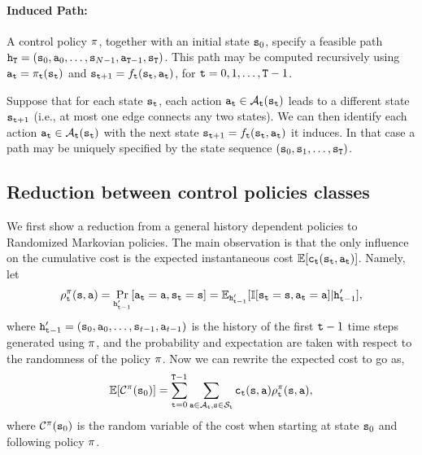 \paragraph{Induced Path:}
A control policy $\pi $, together with an initial state
${{\tt s}_0}$, specify a feasible path ${{\tt h}_{\tt T}} =
({{\tt s}_0},{{\tt a}_0}, \ldots ,{{\tt s}_{N -
1}},{{\tt a}_{{\tt T} - 1}},{{\tt s}_{\tt T}})$. This path may be
computed recursively using ${{\tt a}_{{\tt t}}} = {\pi
_{{\tt t}}}({{\tt s}_{{\tt t}}})$ and ${{\tt s}_{{\tt t} + 1}} =
{f_{{\tt t}}}({{\tt s}_{{\tt t}}},{{\tt a}_{{\tt t}}})$, for ${\tt t} =
0,1, \ldots ,{\tt T} - 1$.

\begin{remark}
Suppose that for each state ${{\tt s}_{{\tt t}}}$, each action
${{\tt a}_{{\tt t}}} \in {\mathcal{A}_{{\tt t}}}({{\tt s}_{{\tt t}}})$
leads to a different state ${{\tt s}_{{\tt t} + 1}}$ (i.e., at most
one edge connects any two states). We can then identify each action
${{\tt a}_{{\tt t}}} \in {\mathcal{A}_{{\tt t}}}({\tt s}_{{\tt t}})$ with
the next state ${{\tt s}_{{\tt t} + 1}} =
{f_{{\tt t}}}({\tt s}_{{\tt t}},{{\tt a}_{{\tt t}}})$ it induces. In
that case a path may be uniquely specified by the state sequence
$({{\tt s}_0},{{\tt s}_1}, \ldots ,{{\tt s}_{\tt T}})$.
\end{remark}


\subsection{Reduction between control policies classes}\label{chp2:sec:FH-HS-MD}

We first show a reduction from a general history dependent policies
to Randomized Markovian policies. The main observation is that the
only influence on the cumulative cost is the expected instantaneous
cost $\mathbb{E}[{\tt c}_{\tt t}({\tt s}_{\tt t},{\tt a}_{\tt t})]$. Namely, let
\[
\rho^\pi_{\tt t}({\tt s},{\tt a})=\Pr_{{\tt h}'_{{\tt t}-1}}
[{\tt a}_{\tt t}={\tt a},{\tt s}_{\tt t}={\tt s}]=\mathbb{E}_{{\tt h}'_{{\tt t}-1}}[\mathbb{I}
[{\tt s}_{\tt t}={\tt s},{\tt a}_{\tt t}={\tt a}]| {\tt h}'_{{\tt t}-1}],
\]
where
${\tt h}'_{{\tt t}-1}=({\tt s}_0,{\tt a}_0,\ldots,{\tt s}_{t-1},{\tt a}_{t-1})$
is the history of the first ${\tt t}-1$ time steps generated using
$\pi$, and the probability and expectation are taken with
respect to the randomness of the policy $\pi$. Now we can
rewrite the expected cost to go as,
\[
\mathbb{E}[\mathcal{C}^\pi({\tt s}_0)]=\sum_{{\tt t}=0}^{{\tt T}-1}
\sum_{{\tt a}\in \mathcal{A}_{\tt t},{\tt s}\in \mathcal{S}_{\tt t}}
{\tt c}_{\tt t}({\tt s},{\tt a})\rho^\pi_{\tt t}({\tt s},{\tt a}),
\]
where $\mathcal{C}^\pi({\tt s}_0)$ is the random variable of the cost
when starting at state ${\tt s}_0$ and following policy $\pi$.


